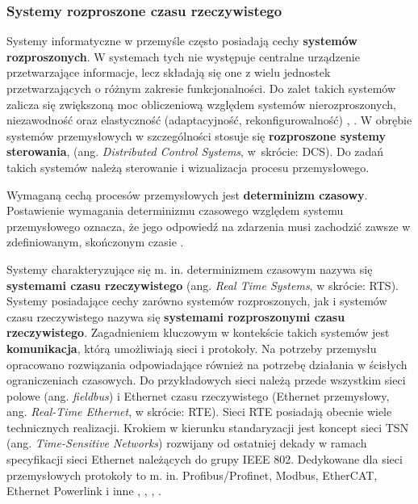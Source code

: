 \documentclass[a4paper, 12pt, twoside]{article}
\begin{document}
\subsubsection{Systemy rozproszone czasu rzeczywistego}

Systemy informatyczne w przemyśle często posiadają cechy \textbf{systemów rozproszonych}.
W systemach tych nie występuje centralne urządzenie
przetwarzające informacje, lecz składają się one z wielu jednostek
przetwarzających o różnym zakresie funkcjonalności. Do zalet
takich systemów zalicza się zwiększoną moc obliczeniową względem systemów nierozproszonych,
niezawodność oraz elastyczność (adaptacyjność, rekonfigurowalność)
\cite{isp},
\cite{isp-analiza-przepływu-informacji}. W obrębie systemów przemysłowych
w szczególności stosuje się \textbf{rozproszone systemy sterowania},
(ang. \emph{Distributed Control Systems}, w~skrócie: DCS). Do zadań takich systemów
należą sterowanie i wizualizacja procesu przemysłowego.

Wymaganą cechą procesów przemysłowych jest \textbf{determinizm czasowy}.
Postawienie wymagania determinizmu czasowego względem systemu przemysłowego oznacza,
że jego odpowiedź na zdarzenia musi zachodzić zawsze w zdefiniowanym, skończonym czasie
\cite{isp}.

Systemy charakteryzujące się m. in. determinizmem czasowym nazywa się
\textbf{systemami czasu rzeczywistego} (ang. \emph{Real Time Systems}, w skrócie: RTS).
Systemy posiadające cechy zarówno systemów rozproszonych, jak i systemów
czasu rzeczywistego nazywa się \textbf{systemami rozproszonymi czasu rzeczywistego}.
Zagadnieniem kluczowym w kontekście takich systemów
jest \textbf{komunikacja}, którą umożliwiają sieci i protokoły.
Na potrzeby przemysłu opracowano rozwiązania odpowiadające również na potrzebę
działania w ścisłych ograniczeniach czasowych. Do przykładowych sieci należą przede wszystkim
sieci polowe (ang. \emph{fieldbus}) i Ethernet czasu rzeczywistego (Ethernet przemysłowy, ang. \emph{Real-Time Ethernet}, w skrócie: RTE).
Sieci RTE posiadają obecnie wiele technicznych realizacji. Krokiem w kierunku
standaryzacji  jest koncept sieci TSN (ang. \emph{Time-Sensitive Networks})
rozwijany od ostatniej dekady w ramach specyfikacji sieci Ethernet należących do grupy IEEE 802.
Dedykowane dla sieci przemysłowych protokoły to m. in. Profibus/Profinet,
Modbus, EtherCAT, Ethernet Powerlink i inne \cite{isp}, \cite{isp-analiza-przepływu-informacji},
\cite{tsn-for-dummies}, \cite{rte-standards-and-impl}.
\end{document}
